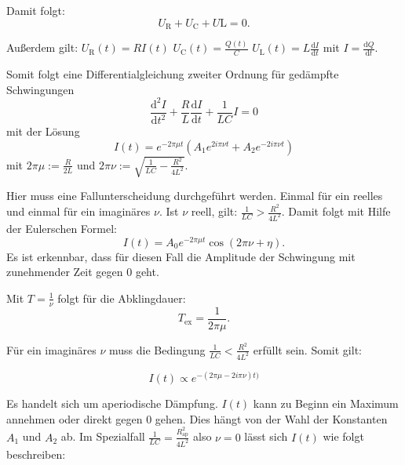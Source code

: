 Damit folgt:
\begin{equation}
  U_{\mathrm R} + U_{\mathrm C} + U{\mathrm L} = 0.
\end{equation}

Außerdem gilt:
$U_{\mathrm R}(t) = R I(t)$
$U_{\mathrm C}(t) = \frac{Q(t)}{C}$
$U_{\mathrm L}(t) = L \frac{\mathrm{d}I}{\mathrm{d}t}$ mit $I = \frac{\mathrm{d}Q}{\mathrm{d}t}$.

Somit folgt eine Differentialgleichung zweiter Ordnung für gedämpfte Schwingungen
\begin{equation}
  \label{eqn:dgl}
  \frac{\mathrm{d}^2 I}{\mathrm{d}t^2} + \frac{R}{L} \frac{\mathrm{d}I}{\mathrm{d}t} + \frac{1}{LC} I = 0
\end{equation}
 mit der Lösung
 \begin{equation}
   I(t) = e^{-2\pi \mu t}(A_{1} e^{2i\pi \nu t} + A_{2} e^{-2i\pi \nu t})
\end{equation}
mit $2\pi \mu := \frac{R}{2L}$ und $2\pi \nu := \sqrt{\frac{1}{LC} - \frac{R^2}{4L^2}}$.

Hier muss eine Fallunterscheidung durchgeführt werden. Einmal für ein reelles und einmal für ein imaginäres $\nu$.
Ist $\nu$ reell, gilt: $\frac{1}{LC} > \frac{R^2}{4L^2}$. Damit folgt mit Hilfe der Eulerschen Formel:
\begin{equation}
  I(t) = A_0 e^{-2\pi \mu t} \cos(2\pi\nu + \eta).
\end{equation}
Es ist erkennbar, dass für diesen Fall die Amplitude der Schwingung mit zunehmender Zeit gegen 0 geht.

Mit $T = \frac{1}{\nu}$ folgt für die Abklingdauer:
\begin{equation}
  T_{\mathrm{ex}} = \frac{1}{2\pi\mu}.
\end{equation}


Für ein imaginäres $\nu$ muss die Bedingung $\frac{1}{LC} < \frac{R^2}{4L^2}$ erfüllt sein.
Somit gilt:

\begin{equation}
  I(t) \propto e^{-(2\pi\mu -2i\pi\nu)t)}
\end{equation}

Es handelt sich um aperiodische Dämpfung. $I(t)$ kann zu Beginn ein Maximum annehmen oder direkt gegen 0 gehen. Dies hängt von der Wahl der Konstanten $A_{1}$ und $A_{2}$ ab.
Im Spezialfall $\frac{1}{LC} = \frac{R_{\mathrm{ap}}^2}{4L^2}$ also $\nu = 0$
lässt sich $I(t)$ wie folgt beschreiben:

